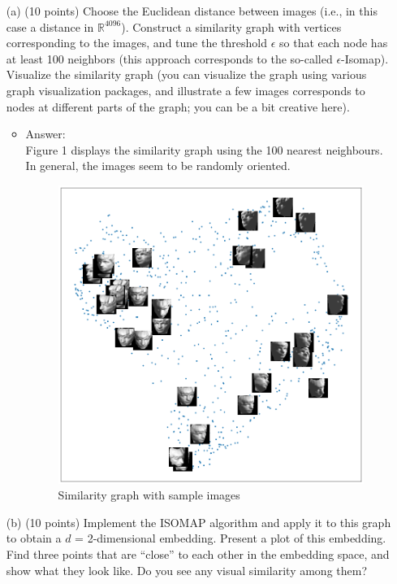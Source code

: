 \documentclass[twoside,10pt]{article}
\begin{document}
\begin{enumerate} 
\item[(a)] (10 points) Choose the Euclidean distance between images (i.e., in this case a distance in $\mathbb R^{4096}$). Construct a similarity graph with vertices corresponding to the images, and tune the threshold $\epsilon$ so that each node has at least 100 neighbors (this approach corresponds to the so-called $\epsilon$-Isomap). Visualize the similarity graph (you can visualize the graph  using various graph visualization packages, and illustrate a few images corresponds to nodes at different parts of the graph; you can be a bit creative here).

\begin{itemize}
\item Answer:\\
Figure 1 displays the similarity graph using the 100 nearest neighbours. In general, the images seem to be randomly oriented.
\begin{figure}[h!]
\begin{center}
\includegraphics[totalheight=3in]{Images/Q1a.png}
\end{center}
\caption{Similarity graph with sample images}
\end{figure}
\end{itemize}
 
\item[(b)] (10 points) Implement the ISOMAP algorithm and apply it to this graph to obtain a $d$ = 2-dimensional embedding. Present a plot of this embedding. Find three points that are ``close'' to each other in the embedding space, and show what they look like. Do you see any visual similarity among them?


\end{enumerate}
\end{document}
